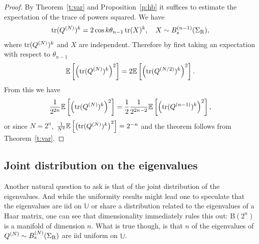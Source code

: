 \documentclass{amsart}
\theoremstyle{definition}
\theoremstyle{remark}
\numberwithin{equation}{section}
\DeclareMathOperator{\tr}{tr}
\begin{document}
\begin{proof}
By Theorem~\ref{t:var} and Proposition~\ref{p:hb} it suffices to estimate the expectation of the trace of powers squared.  We have
\begin{align}\label{e:tr-struct}
\tr (Q\pp{N})^k = 2 \cos k \theta_{n-1} \tr (X)^k, \quad X \sim B_s\pp{n-1}(\Sigma_{\mathrm{R}}),
\end{align}
 where $\tr (Q\pp{N})^k$ and $X$ are independent. Therefore by first taking an expectation with respect to $\theta_{n-1}$
\begin{align}
\mathbb E  \left[ \left( \tr (Q\pp{N})^k \right)^2 \right] = 2 \mathbb E \left[ \left( \tr (Q\pp{N/2})^k \right)^2 \right].
 \end{align}
 From this we have
 \begin{align}\label{e:intout}
 \frac{1}{2^{2n}}\mathbb E\left[ \left( \tr (Q\pp{N})^k \right)^2 \right] = \frac{1}{2}  \frac{1}{2^{2n-2}} \mathbb E \left[ \left( \tr (Q\pp{n-1})^k \right)^2 \right],
 \end{align}
 or since $N = 2^{n}$, $\frac{1}{N^2}\mathbb E \left[ \left( \tr (Q\pp{N})^k \right)^2 \right] = 2^{-n}$ and the theorem follows from Theorem~\ref{t:var}.
\end{proof}

\subsection{Joint distribution on the eigenvalues}

Another natural question to ask is that of the joint distribution of the eigenvalues.  And while the uniformity results might lead one to speculate that the eigenvalues are iid on $\mathbb U$ or share a distribution related to the eigenvalues of a Haar matrix, one can see that dimensionality immediately rules this out: $\mathrm B(2^{n})$ is a manifold of dimension $n$.  What is true though, is that $n$ of the eigenvalues of $Q^{(N)} \sim B_s^{(N)}(\Sigma_{\mathrm{R}})$ are iid uniform on $\mathbb U$.
\end{document}
